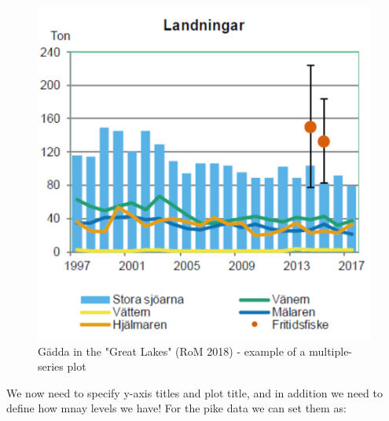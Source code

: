 \documentclass[]{article}
\newenvironment{Shaded}{\begin{snugshade}}{\end{snugshade}}
\newcommand{\KeywordTok}[1]{\textcolor[rgb]{0.13,0.29,0.53}{\textbf{#1}}}
\newcommand{\StringTok}[1]{\textcolor[rgb]{0.31,0.60,0.02}{#1}}
\newcommand{\OperatorTok}[1]{\textcolor[rgb]{0.81,0.36,0.00}{\textbf{#1}}}
\newcommand{\NormalTok}[1]{#1}
\begin{document}
\begin{figure}

{\centering \includegraphics{gadda} 

}

\caption{Gädda in the "Great Lakes" (RoM 2018) - example of a multiple-series plot}\label{fig:unnamed-chunk-17}
\end{figure}

We now need to specify y-axis titles and plot title, and in addition we
need to define how mnay levels we have! For the pike data we can set
them as:

\begin{Shaded}
\end{Shaded}
\end{document}
